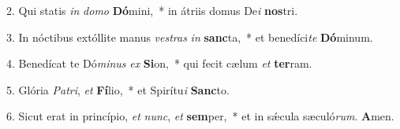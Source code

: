 2. Qui statis \textit{in} \textit{do}\textit{mo} \textbf{Dó}mini,~*  in átriis domus De\textit{i} \textbf{nos}tri.\

3. In nóctibus extóllite manus \textit{ves}\textit{tras} \textit{in} \textbf{sanc}ta,~*  et benedíci\textit{te} \textbf{Dó}minum.\

4. Benedícat te Dó\textit{mi}\textit{nus} \textit{ex} \textbf{Si}on,~*  qui fecit cælum \textit{et} \textbf{ter}ram.\

5. Glória \textit{Pa}\textit{tri}, \textit{et} \textbf{Fí}lio,~*  et Spirítu\textit{i} \textbf{Sanc}to.\

6. Sicut erat in princípio, \textit{et} \textit{nunc}, \textit{et} \textbf{sem}per,~*  et in sǽcula sæculó\textit{rum}. \textbf{A}men.\

